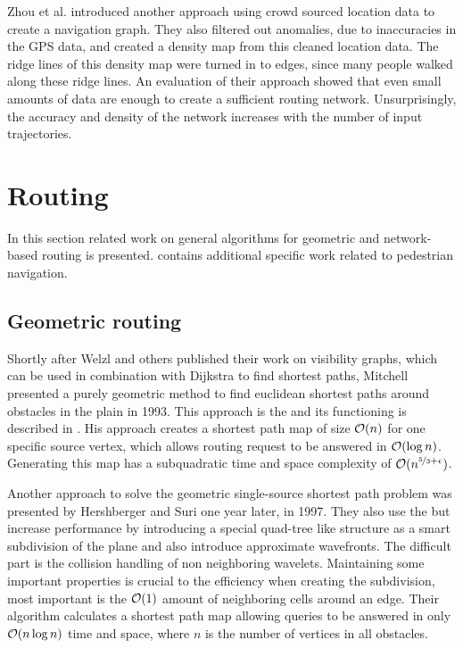 		Zhou et al. introduced another approach using crowd sourced location data to create a navigation graph\cite{zhou-crowd-sourced-navigation}.
		They also filtered out anomalies, due to inaccuracies in the GPS data, and created a density map from this cleaned location data.
		The ridge lines of this density map were turned in to edges, since many people walked along these ridge lines.
		An evaluation of their approach showed that even small amounts of data are enough to create a sufficient routing network.
		Unsurprisingly, the accuracy and density of the network increases with the number of input trajectories.
	
\section{Routing}

	In this section related work on general algorithms for geometric and network-based routing is presented.
	 contains additional specific work related to pedestrian navigation.
	
	\subsection{Geometric routing}
	\label{subsec:related-work-geometric-routing}
	
		\label{related-work:mitchell}
		Shortly after Welzl and others published their work on visibility graphs, which can be used in combination with Dijkstra to find shortest paths, Mitchell presented a purely geometric method to find euclidean shortest paths around obstacles in the plain in 1993\cite{mitchell-shortest-path}.
		This approach is the  and its functioning is described in .
		His approach creates a shortest path map of size $\mathcal{O}(n)$ for one specific source vertex, which allows routing request to be answered in $\mathcal{O}(\log{n})$.
		Generating this map has a subquadratic time and space complexity of $\mathcal{O}(n^{\nicefrac{5}{3}+\epsilon})$.
		
		Another approach to solve the geometric single-source shortest path problem was presented by Hershberger and Suri one year later, in 1997\cite{hershberger-suri}.
		They also use the  but increase performance by introducing a special quad-tree like structure as a smart subdivision of the plane and also introduce approximate wavefronts.
		The difficult part is the collision handling of non neighboring wavelets.
		Maintaining some important properties is crucial to the efficiency when creating the subdivision, most important is the $\mathcal{O}(1)$ amount of neighboring cells around an edge.
		Their algorithm calculates a shortest path map allowing queries to be answered in only $\mathcal{O}(n \log n)$ time and space, where $n$ is the number of vertices in all obstacles.
		

